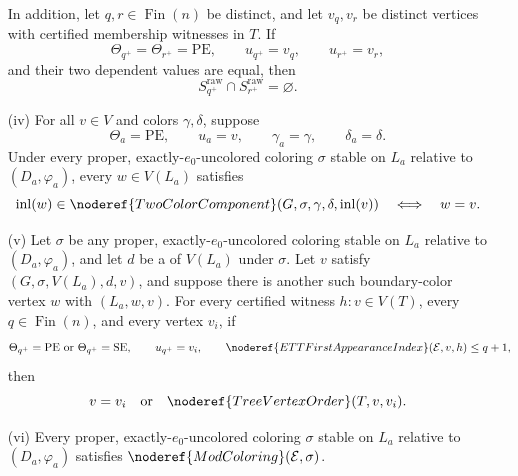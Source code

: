 \begin{theorem}
\begin{enumerate}
In addition, let \(q,r\in\operatorname{Fin}(n)\) be distinct, and let
\(v_q,v_r\) be distinct vertices with certified membership witnesses in
\(T\).  If
\[
 \Theta_{q^+}=\Theta_{r^+}=\mathrm{PE},\qquad
 u_{q^+}=v_q,\qquad u_{r^+}=v_r,
\]
and their two dependent
 values are equal, then
\[
          S_{q^+}^{\mathrm{raw}}\cap S_{r^+}^{\mathrm{raw}}
          =\varnothing.
\]

\item[(iv)]
For all \(v\in V\) and colors \(\gamma,\delta\), suppose
\[
 \Theta_a=\mathrm{PE},\qquad u_a=v,\qquad
 \gamma_a=\gamma,\qquad\delta_a=\delta.
\]
Under every proper, exactly-\(e_0\)-uncolored coloring \(\sigma\) stable on
\(L_a\) relative to \((D_a,\varphi_a)\), every \(w\in V(L_a)\) satisfies
\[
 \operatorname{inl}(w)\in
   \noderef{TwoColorComponent}
     (G,\sigma,\gamma,\delta,\operatorname{inl}(v))
 \quad\Longleftrightarrow\quad w=v.
\]

\item[(v)]
Let \(\sigma\) be any proper, exactly-\(e_0\)-uncolored coloring stable on
\(L_a\) relative to \((D_a,\varphi_a)\), and let \(d\) be a
 of \(V(L_a)\) under \(\sigma\).  Let \(v\) satisfy
\((G,\sigma,V(L_a),d,v)\), and suppose there
is another such boundary-color vertex \(w\) with
\((L_a,w,v)\).  For every certified witness
\(h:v\in V(T)\), every \(q\in\operatorname{Fin}(n)\), and every vertex
\(v_i\), if
\[
 \Theta_{q^+}=\mathrm{PE}\ \hbox{or}\ \Theta_{q^+}=\mathrm{SE},
 \qquad u_{q^+}=v_i,\qquad
 \noderef{ETTFirstAppearanceIndex}(\mathcal E,v,h)\leq q+1,
\]
then
\[
                v=v_i\quad\hbox{or}\quad
                \noderef{TreeVertexOrder}(T,v,v_i).
\]

\item[(vi)]
Every proper, exactly-\(e_0\)-uncolored coloring \(\sigma\) stable on
\(L_a\) relative to \((D_a,\varphi_a)\) satisfies
\(\noderef{ModColoring}(\mathcal E,\sigma)\).
\end{enumerate}
\end{theorem}
